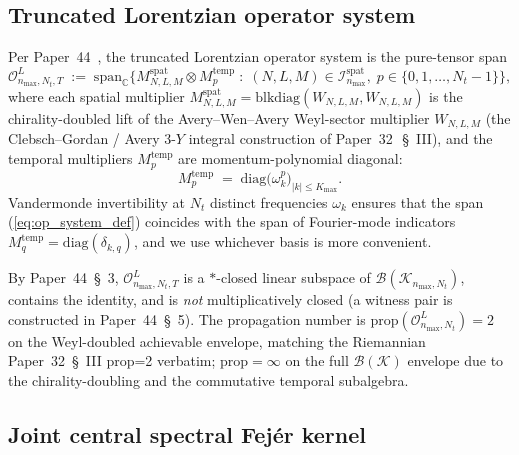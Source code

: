 \documentclass[11pt,a4paper]{article}
\theoremstyle{plain}
\theoremstyle{definition}
\newcommand{\nmax}{n_{\max}}
\newcommand{\Nt}{N_{t}}
\newcommand{\Kmax}{K_{\max}}
\newcommand{\Krein}{\mathcal{K}}
\newcommand{\Op}{\mathcal{O}}
\newcommand{\Bcal}{\mathcal{B}}
\newcommand{\C}{\mathbb{C}}
\newcommand{\prop}{\mathrm{prop}}
\newcommand{\spat}{\mathrm{spat}}
\newcommand{\temp}{\mathrm{temp}}
\begin{document}
\subsection{Truncated Lorentzian operator system}\label{sec:op_system}

Per Paper~44~\cite{paper44}, the truncated Lorentzian operator system
is the pure-tensor span
\begin{equation}\label{eq:op_system_def}
   \Op^{L}_{\nmax,\Nt,T}
   \;:=\; \mathrm{span}_{\C}\bigl\{
            M^{\spat}_{N,L,M} \otimes M^{\temp}_{p}
            \;:\; (N, L, M) \in \mathcal{I}^{\spat}_{\nmax},\;
                  p \in \{0, 1, \ldots, \Nt - 1\}
         \bigr\},
\end{equation}
where each spatial multiplier
$M^{\spat}_{N,L,M} = \mathrm{blkdiag}(W_{N,L,M}, W_{N,L,M})$ is the
chirality-doubled lift of the Avery--Wen--Avery Weyl-sector
multiplier $W_{N,L,M}$ (the Clebsch--Gordan / Avery 3-$Y$ integral
construction of Paper~32~\cite{paper32}\,\S~III), and the temporal
multipliers $M^{\temp}_{p}$ are momentum-polynomial diagonal:
\begin{equation}\label{eq:temp_multipliers}
   M^{\temp}_{p} \;=\; \mathrm{diag}\bigl(\omega_{k}^{p}\bigr)_{|k| \le \Kmax}.
\end{equation}
Vandermonde invertibility at $\Nt$ distinct frequencies $\omega_{k}$
ensures that the span (\ref{eq:op_system_def}) coincides with the
span of Fourier-mode indicators $M^{\temp}_{q} =
\mathrm{diag}(\delta_{k,q})$, and we use whichever basis is more
convenient.

By Paper~44~\S~3, $\Op^{L}_{\nmax,\Nt,T}$ is a $\ast$-closed linear
subspace of $\Bcal(\Krein_{\nmax,\Nt})$, contains the identity, and
is \emph{not} multiplicatively closed (a witness pair is constructed
in Paper~44~\S~5). The propagation number is
$\prop(\Op^{L}_{\nmax,\Nt}) = 2$ on the Weyl-doubled achievable
envelope, matching the Riemannian Paper~32~\S~III prop=2 verbatim;
$\prop = \infty$ on the full $\Bcal(\Krein)$ envelope due to the
chirality-doubling and the commutative temporal subalgebra.

\subsection{Joint central spectral Fej\'er kernel}\label{sec:joint_fejer}
\end{document}
